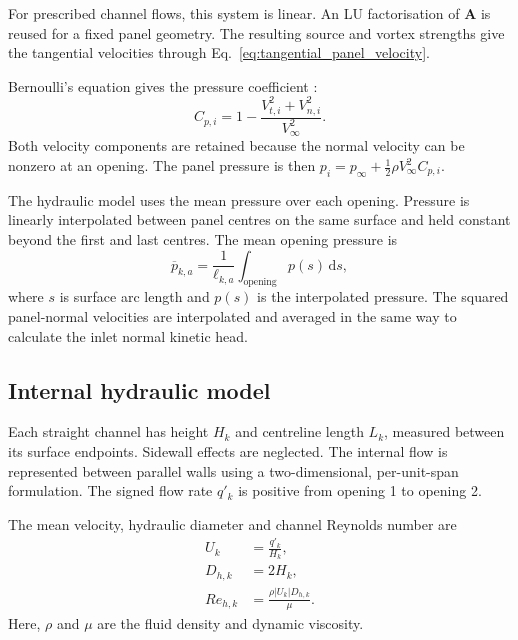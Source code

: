 \documentclass[a4paper,fleqn]{cas-dc}
\begin{document}
For prescribed channel flows, this system is linear.
An LU factorisation of $\mathbf{A}$ is reused for
a fixed panel geometry.
The resulting source and vortex strengths give
the tangential velocities through
Eq.~\eqref{eq:tangential_panel_velocity}.

Bernoulli's equation gives the pressure coefficient
\cite{KatzPlotkin2001LowSpeedAerodynamics}:
\begin{equation}
	C_{p,i}
	=
	1-\frac{V_{t,i}^{2}+V_{n,i}^{2}}{V_{\infty}^{2}}.
	\label{eq:pressure_coefficient}
\end{equation}
Both velocity components are retained because
the normal velocity can be nonzero at an opening.
The panel pressure is then
$p_i=p_{\infty}+\tfrac{1}{2}\rho V_{\infty}^{2}C_{p,i}$.

The hydraulic model uses the mean pressure over each
opening. Pressure is linearly interpolated between
panel centres on the same surface and held constant
beyond the first and last centres.
The mean opening pressure is
\begin{equation}
	\overline{p}_{k,a}
	=
	\frac{1}{\ell_{k,a}}
	\int_{\text{opening}}p(s)\,\mathrm{d}s,
	\label{eq:opening_pressure_average}
\end{equation}
where $s$ is surface arc length and $p(s)$ is
the interpolated pressure.
The squared panel-normal velocities are interpolated
and averaged in the same way to calculate
the inlet normal kinetic head.

\subsection{Internal hydraulic model}
\label{subsec:internal_hydraulics}

Each straight channel has height $H_k$ and centreline
length $L_k$, measured between its surface endpoints.
Sidewall effects are neglected.
The internal flow is represented between parallel walls
using a two-dimensional, per-unit-span formulation.
The signed flow rate $q'_k$ is positive from opening 1
to opening 2.

The mean velocity, hydraulic diameter and channel
Reynolds number are
\begin{align}
	U_k &= \frac{q'_k}{H_k},
	\label{eq:channel_velocity}\\
	D_{h,k} &= 2H_k,
	\label{eq:hydraulic_diameter}\\
	Re_{h,k} &= \frac{\rho |U_k|D_{h,k}}{\mu}.
	\label{eq:channel_reynolds}
\end{align}
Here, $\rho$ and $\mu$ are the fluid density and
dynamic viscosity.
\end{document}
